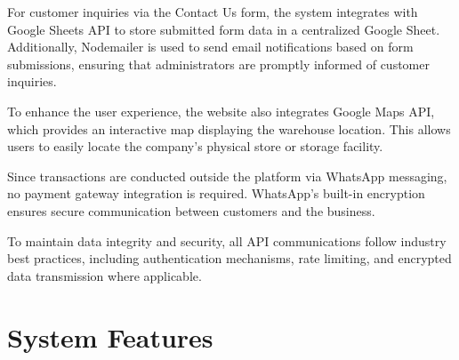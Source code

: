 \documentclass[oneside,a4paper,12pt,explicit]{book}
\begin{document}
For customer inquiries via the Contact Us form, the system integrates with Google Sheets API to store submitted form data in a centralized Google Sheet. Additionally, Nodemailer is used to send email notifications based on form submissions, ensuring that administrators are promptly informed of customer inquiries.

To enhance the user experience, the website also integrates Google Maps API, which provides an interactive map displaying the warehouse location. This allows users to easily locate the company's physical store or storage facility.

Since transactions are conducted outside the platform via WhatsApp messaging, no payment gateway integration is required. WhatsApp's built-in encryption ensures secure communication between customers and the business.

To maintain data integrity and security, all API communications follow industry best practices, including authentication mechanisms, rate limiting, and encrypted data transmission where applicable.

\chapter{System Features}



\end{document}
